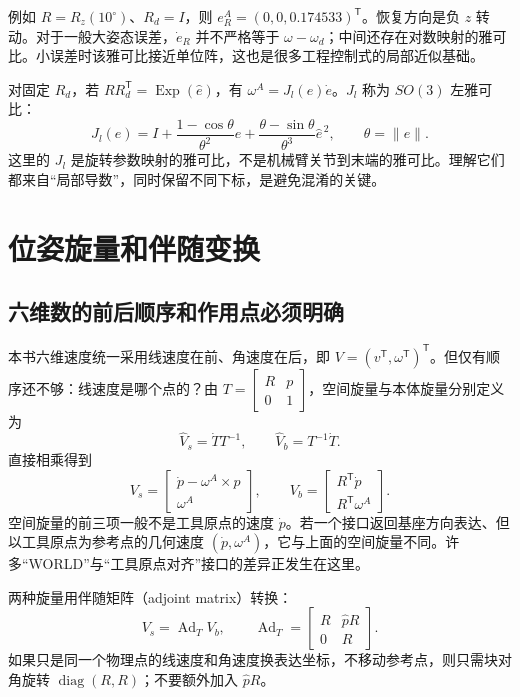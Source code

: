 例如 $R=R_z(10^\circ)$、$R_d=I$，则 $e_R^A=(0,0,0.174533)^\mathsf T$。恢复方向是负 $z$ 转动。对于一般大姿态误差，$\dot e_R$ 并不严格等于 $\omega-\omega_d$；中间还存在对数映射的雅可比。小误差时该雅可比接近单位阵，这也是很多工程控制式的局部近似基础。

对固定 $R_d$，若 $R R_d^\mathsf T=\operatorname{Exp}(\widehat e)$，有 $\omega^A=J_l(e)\dot e$。$J_l$ 称为 $SO(3)$ 左雅可比：
\begin{equation}
 J_l(e)=I+\frac{1-\cos\theta}{\theta^2}\widehat e
 +\frac{\theta-\sin\theta}{\theta^3}\widehat e^{\,2},\qquad\theta=\|e\|.
\end{equation}
这里的 $J_l$ 是旋转参数映射的雅可比，不是机械臂关节到末端的雅可比。理解它们都来自“局部导数”，同时保留不同下标，是避免混淆的关键。

\section{位姿旋量和伴随变换}
\subsection{六维数的前后顺序和作用点必须明确}
本书六维速度统一采用线速度在前、角速度在后，即 $V=(v^\mathsf T,\omega^\mathsf T)^\mathsf T$。但仅有顺序还不够：线速度是哪个点的？由 $T=\begin{bmatrix}R&p\\0&1\end{bmatrix}$，空间旋量与本体旋量分别定义为
\begin{equation}
 \widehat V_s=\dot TT^{-1},\qquad
 \widehat V_b=T^{-1}\dot T.
\end{equation}
直接相乘得到
\begin{equation}
 V_s=\begin{bmatrix}\dot p-\omega^A\times p\\\omega^A\end{bmatrix},
 \qquad
 V_b=\begin{bmatrix}R^\mathsf T\dot p\\R^\mathsf T\omega^A\end{bmatrix}.
\end{equation}
空间旋量的前三项一般不是工具原点的速度 $\dot p$。若一个接口返回基座方向表达、但以工具原点为参考点的几何速度 $(\dot p,\omega^A)$，它与上面的空间旋量不同。许多“WORLD”与“工具原点对齐”接口的差异正发生在这里。

两种旋量用伴随矩阵（adjoint matrix）转换：
\begin{equation}
 V_s=\operatorname{Ad}_T V_b,
 \qquad
 \operatorname{Ad}_T=\begin{bmatrix}R&\widehat pR\\0&R\end{bmatrix}.
\end{equation}
如果只是同一个物理点的线速度和角速度换表达坐标，不移动参考点，则只需块对角旋转 $\operatorname{diag}(R,R)$；不要额外加入 $\widehat pR$。

